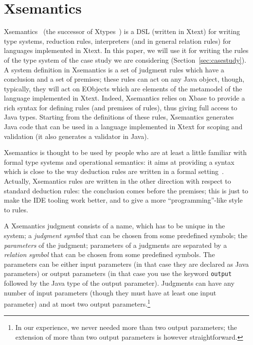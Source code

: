 \section{Xsemantics}
\label{sec:xsemantics}

Xsemantics~\cite{lbts} (the successor of Xtypes~\cite{Bet11}) is a DSL (written
in Xtext) for writing type systems, reduction rules, interpreters (and in
general relation rules) for languages implemented in Xtext.
In this paper, we will use it for writing the rules of the type system of the
case study we are considering (Section~\ref{sec:casestudy}).
A system definition in Xsemantics is a set of judgment rules which have a
conclusion and a set of premises; these rules can act on any Java object,
though, typically, they will act on EObjects which are elements of the metamodel
of the language implemented in Xtext.  Indeed, Xsemantics relies on Xbase to
provide a rich syntax for defining rules (and premises of rules), thus giving
full access to Java types.
Starting from the definitions of these rules, Xsemantics generates Java code
that can be used in a language implemented in Xtext for scoping and validation
(it also generates a validator in Java).

Xsemantics is thought to be used by people who are at least a little familiar
with formal type systems and operational semantics: it aims at providing
a syntax which is close to the way deduction rules are written in a formal
setting~\cite{hindley:1997a,Pierce02}.
Actually, Xsemantics rules are written in the other direction with respect
to standard deduction rules: the conclusion comes before the premises; this is
just to make the IDE tooling work better, and to give a more ``programming''-like
style to rules.



A Xsemantics judgment consists of a name, which has to be unique in the system;
a \textit{judgment symbol} that can be chosen from some predefined symbols; the
\textit{parameters} of the judgment; parameters of a judgments are separated by
a \textit{relation symbol} that can be chosen from some predefined symbols.
The parameters can be either input parameters (in that case they are declared as
Java parameters) or output parameters (in that case you use the keyword
\verb|output| followed by the Java type of the output parameter).
Judgments can have any number of input parameters (though they must have at
least one input parameter) and at most two output parameters.\footnote{In our
experience, we never needed more than two output parameters; the extension of
more than two output parameters is however straightforward.}

